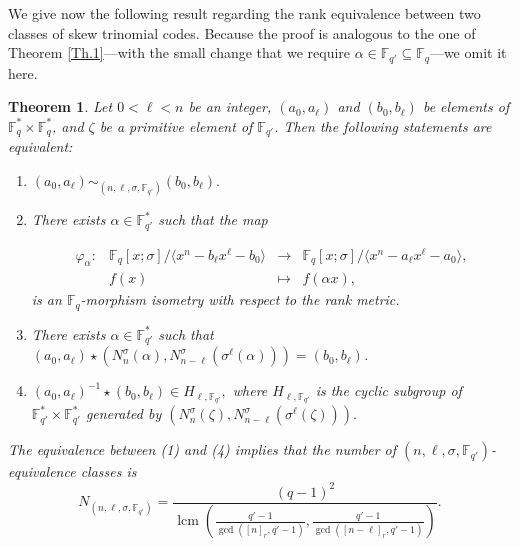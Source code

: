 \documentclass[12pt,paper]{article}
\theoremstyle{plain}
\newtheorem{theorem}{Theorem}[section] %
\newcommand{\Fq}{\mathbb{F}_{q}}
\DeclareMathOperator{\lcm}{lcm}
\begin{document}
We give now the following result regarding the rank equivalence between two classes of skew trinomial codes. Because the proof is analogous to the one of Theorem \ref{Th.1}---with the small change that we require $\alpha \in \mathbb{F}_{q'}\subseteq \Fq$---we omit it here. 
\begin{theorem}\label{Th.RankEquiv}
Let $0<\ell<n$ be an integer,  $(a_0, a_{\ell})$ and $(b_0, b_{\ell})$ be elements of $\mathbb{F}_q^{*} \times \mathbb{F}_q^{*}$,  and   $\zeta$ be  a primitive element of $\mathbb{F}_{q'}$. 
Then the following statements are equivalent:

\begin{enumerate}
    \item   $ (a_0, a_{\ell})  \sim_{( n,\ell,\sigma, \mathbb{F}_{q'})} (b_0, b_{\ell}) .$ 
    \item There exists $\alpha \in  \mathbb{F}_{q'}^*$ such that the map

  \begin{equation}
  	\begin{array}{cccc}
  	\varphi_{\alpha}:& \mathbb{F}_q[x;\sigma] /\langle x^n-b_{\ell}x^{\ell}-b_0 \rangle  &\longrightarrow & \mathbb{F}_q[x;\sigma] /\langle x^n-a_{\ell} x^{\ell}-a_0 \rangle, \\ 
  	& f(x) & \longmapsto &  f(\alpha x),
  	\end{array}
  	\end{equation} 
    is an  $\mathbb{F}_q$-morphism isometry with respect to the rank metric.
       
     \item  There exists $\alpha\in  \mathbb{F}_{q'}^* $ such that $ (a_0,a_{\ell})\star (N_n^{\sigma}(\alpha), N_{n-\ell}^{\sigma}(\sigma^{\ell}(\alpha)))= (b_0,b_{\ell}) $.

      \item  $ (a_0, a_{\ell})^{-1} \star(b_0,b_{\ell})\in H_{\ell,  \mathbb{F}_{q'}},$ where   $ H_{\ell, \mathbb{F}_{q'}}$ is the cyclic subgroup of $  \mathbb{F}_{q'}^*\times  \mathbb{F}_{q'}^*$ generated by $( N_n^{\sigma}(\zeta), N_{n-\ell}^{\sigma}(\sigma^{\ell}(\zeta)) ) .$
\end{enumerate}
The equivalence between (1) and (4) implies that the number of $( n,\ell,\sigma, \mathbb{F}_{q'})$-equivalence classes is $$ 
N_{( n,\ell,\sigma, \mathbb{F}_{q'})}=\dfrac{ (q-1)^2}{ \lcm(\frac{q'-1}{ \gcd([n]_r,q'-1)}, \frac{q'-1}{ \gcd([n-\ell]_r,q'-1)})} .$$
\end{theorem}
\end{document}
